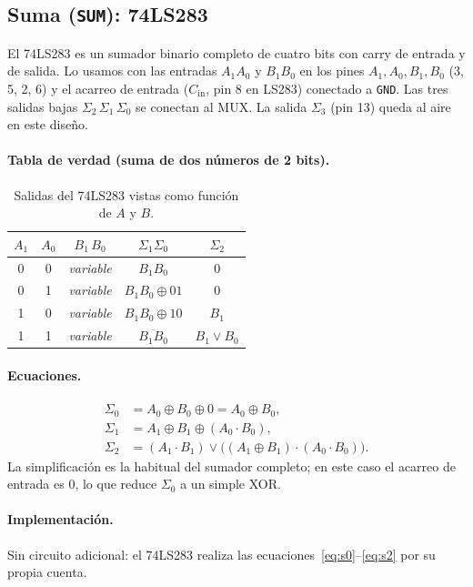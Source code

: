 \documentclass[a4paper,12pt]{article}
\begin{document}
\subsection{Suma (\texttt{SUM}): 74LS283}
El 74LS283 es un sumador binario completo de cuatro bits con carry de
entrada y de salida. Lo usamos con las entradas $A_1A_0$ y $B_1B_0$ en
los pines $A_1, A_0, B_1, B_0$ (3, 5, 2, 6) y el acarreo de entrada
($C_\text{in}$, pin 8 en LS283) conectado a \texttt{GND}. Las tres
salidas bajas \texttt{$\Sigma_2\,\Sigma_1\,\Sigma_0$} se conectan al
MUX. La salida $\Sigma_3$ (pin 13) queda al aire en este dise\~{n}o.

\paragraph{Tabla de verdad (suma de dos n\'{u}meros de 2 bits).}
\begin{table}[H]
\centering
\small
\begin{tabular}{ccc|cc}
\toprule
$A_1$ & $A_0$ & $B_1\,B_0$ & $\Sigma_1\Sigma_0$ & $\Sigma_2$ \\
\midrule
0 & 0 & \textit{variable} & $B_1B_0$ & 0 \\
0 & 1 & \textit{variable} & $B_1B_0 \oplus 01$ & 0 \\
1 & 0 & \textit{variable} & $B_1B_0 \oplus 10$ & $B_1$ \\
1 & 1 & \textit{variable} & $\overline{B_1B_0}$ & $B_1 \lor B_0$ \\
\bottomrule
\end{tabular}
\caption{Salidas del 74LS283 vistas como funci\'{o}n de $A$ y $B$.}
\end{table}

\paragraph{Ecuaciones.}
\begin{align}
\Sigma_0 &= A_0 \oplus B_0 \oplus 0 = A_0 \oplus B_0, \label{eq:s0}\\
\Sigma_1 &= A_1 \oplus B_1 \oplus (A_0 \cdot B_0),              \label{eq:s1}\\
\Sigma_2 &= (A_1 \cdot B_1) \lor \bigl((A_1 \oplus B_1) \cdot (A_0 \cdot B_0)\bigr).
           \label{eq:s2}
\end{align}
La simplificaci\'{o}n es la habitual del sumador completo; en este
caso el acarreo de entrada es $0$, lo que reduce $\Sigma_0$ a un
simple XOR.

\paragraph{Implementaci\'{o}n.} Sin circuito adicional: el 74LS283
realiza las ecuaciones~\ref{eq:s0}--\ref{eq:s2} por su propia cuenta.
\end{document}
